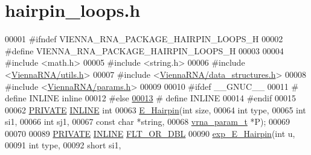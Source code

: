\hypertarget{hairpin__loops_8h_source}{}\section{hairpin\+\_\+loops.\+h}
\label{hairpin__loops_8h_source}

\begin{DoxyCode}
00001 \textcolor{preprocessor}{#ifndef VIENNA\_RNA\_PACKAGE\_HAIRPIN\_LOOPS\_H}
00002 \textcolor{preprocessor}{#define VIENNA\_RNA\_PACKAGE\_HAIRPIN\_LOOPS\_H}
00003 
00004 \textcolor{preprocessor}{#include <math.h>}
00005 \textcolor{preprocessor}{#include <string.h>}
00006 \textcolor{preprocessor}{#include <\mbox{\hyperlink{utils_8h}{ViennaRNA/utils.h}}>}
00007 \textcolor{preprocessor}{#include <\mbox{\hyperlink{data__structures_8h}{ViennaRNA/data\_structures.h}}>}
00008 \textcolor{preprocessor}{#include <\mbox{\hyperlink{params_8h}{ViennaRNA/params.h}}>}
00009 
00010 \textcolor{preprocessor}{#ifdef \_\_GNUC\_\_}
00011 \textcolor{preprocessor}{# define INLINE inline}
00012 \textcolor{preprocessor}{#else}
\mbox{\hyperlink{hairpin__loops_8h_a2eb6f9e0395b47b8d5e3eeae4fe0c116}{00013}} \textcolor{preprocessor}{# define INLINE}
00014 \textcolor{preprocessor}{#endif}
00015 
00062 \mbox{\hyperlink{edit__cost_8h_a5e151c615eda34903514212f05a5ccf8}{PRIVATE}} \mbox{\hyperlink{hairpin__loops_8h_a2eb6f9e0395b47b8d5e3eeae4fe0c116}{INLINE}} \textcolor{keywordtype}{int}
00063 \mbox{\hyperlink{group__loops_gadf943ee9a45b7f4cee9192c06210dace}{E\_Hairpin}}(\textcolor{keywordtype}{int}           size,
00064           \textcolor{keywordtype}{int}           type,
00065           \textcolor{keywordtype}{int}           si1,
00066           \textcolor{keywordtype}{int}           sj1,
00067           \textcolor{keyword}{const} \textcolor{keywordtype}{char}    *\textcolor{keywordtype}{string},
00068           \mbox{\hyperlink{group__energy__parameters_structvrna__param__s}{vrna\_param\_t}}  *P);
00069 
00070 
00089 \mbox{\hyperlink{edit__cost_8h_a5e151c615eda34903514212f05a5ccf8}{PRIVATE}} \mbox{\hyperlink{hairpin__loops_8h_a2eb6f9e0395b47b8d5e3eeae4fe0c116}{INLINE}} \mbox{\hyperlink{group__data__structures_ga31125aeace516926bf7f251f759b6126}{FLT\_OR\_DBL}}
00090 \mbox{\hyperlink{group__loops_ga51fb555974f180b78d76142b2894851c}{exp\_E\_Hairpin}}(\textcolor{keywordtype}{int}               u,
00091               \textcolor{keywordtype}{int}               type,
00092               \textcolor{keywordtype}{short}             si1,

\end{DoxyCode}

